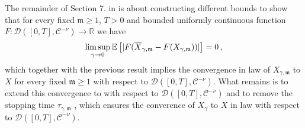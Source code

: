 \documentclass{report}
\newcommand{\RR}{\mathbb{R}}
\DeclarePairedDelimiter\abs{\lvert}{\rvert} %
\newcommand{\Exp}[1]{\mathbb{E}\left[#1\right]}
\theoremstyle{remark}
\theoremstyle{definition}
\begin{document}
The remainder of Section 7. in \cite{mourrat2015convergencetwodimensionaldynamicisingkac} is about constructing different bounds to show that for every fixed $\mathfrak{m} \ge 1$, $T > 0$ and bounded uniformly continuous function $F: \mathcal{D}([0, T], \mathcal{C}^{-\nu}) \to \RR$ we have
\begin{align*}
  \limsup_{\gamma \to 0} \Exp{\abs{F(\overline{X}_{\gamma, \mathfrak{m}} - F(X_{\gamma, \mathfrak{m}}))}} = 0\,,
\end{align*}
which together with the previous result implies the convergence in law of $X_{\gamma, \mathfrak{m}}$ to $X$ for every fixed $\mathfrak{m} \ge 1$ with respect to $\mathcal{D}([0, T], \mathcal{C}^{-\nu})$. What remains is to extend this convergence to with respect to $\mathcal{D}([0, T], \mathcal{C}^{-\nu})$ and to remove the stopping time $\tau_{\gamma, \mathfrak{m}}$  \cite{mourrat2015convergencetwodimensionaldynamicisingkac}, which ensures the converence of $X_\gamma$ to $X$ in law with respect to $\mathcal{D}([0, T], \mathcal{C}^{-\nu})$.
\medskip
\printbibliography
\end{document}
